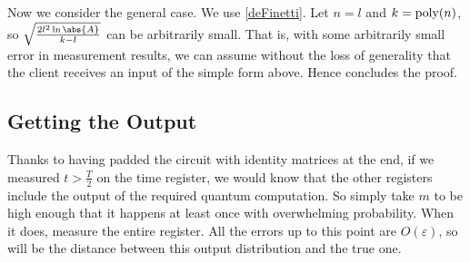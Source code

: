 Now we consider the general case. We use \autoref{deFinetti}. Let $n=l$ and $k=\operatorname*{\operatorname{poly}}(n)$, so $\sqrt{\frac{2l^2\ln\abs{A}}{k-l}}$ can be arbitrarily small. That is, with some arbitrarily small error in measurement results, we can assume without the loss of generality that the client receives an input of the simple form above. Hence concludes the proof.

\subsection{Getting the Output}

Thanks to having padded the circuit with identity matrices at the end, if we measured $t>\frac{T}{2}$ on the time register, we would know that the other registers include the output of the required quantum computation. So simply take $m$ to be high enough that it happens at least once with overwhelming probability. When it does, measure the entire register. All the errors up to this point are $O(\varepsilon)$, so will be the distance between this output distribution and the true one.


